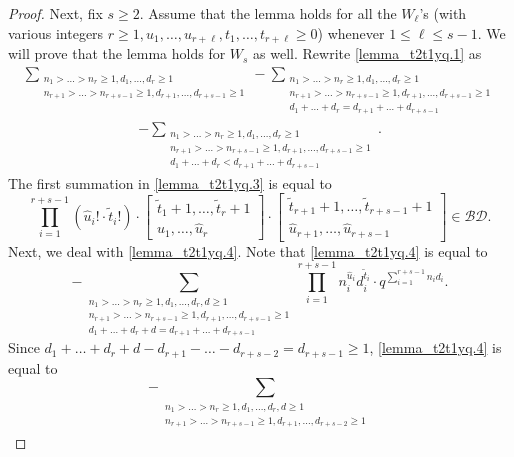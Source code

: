 \documentclass[12pt, reqno]{amsart}
\theoremstyle{definition}
\theoremstyle{remark}
\numberwithin{equation}{section}
\newcommand{\BD}{\mathcal {BD}}
\newcommand{\w}{\tilde}
\numberwithin{equation}{section}
\begin{document}
\begin{proof}
Next, fix $s \ge 2$. Assume that the lemma holds for all the $W_\ell$'s 
(with various integers $r \ge 1, u_1, \ldots, u_{r+\ell}, 
t_1, \ldots, t_{r+\ell} \ge 0$) whenever $1 \le \ell \le s-1$. 
We will prove that the lemma holds for $W_s$ as well.
Rewrite \eqref{lemma_t2t1yq.1} as
\begin{eqnarray}  \label{lemma_t2t1yq.3}
\sum_{\substack{n_1 > \ldots > n_r \ge 1, d_1, \ldots, d_r \ge 1\\
    n_{r+1} > \ldots > n_{r+s-1} \ge 1, d_{r+1}, \ldots, d_{r+s-1} \ge 1}}
- \sum_{\substack{n_1 > \ldots > n_r \ge 1, d_1, \ldots, d_r \ge 1\\
    n_{r+1} > \ldots > n_{r+s-1} \ge 1, d_{r+1}, \ldots, d_{r+s-1} \ge 1\\
    d_1+ \ldots + d_r = d_{r+1} + \ldots + d_{r+s-1}}}
\end{eqnarray}
\begin{eqnarray}  \label{lemma_t2t1yq.4}
- \sum_{\substack{n_1 > \ldots > n_r \ge 1, d_1, \ldots, d_r \ge 1\\
    n_{r+1} > \ldots > n_{r+s-1} \ge 1, d_{r+1}, \ldots, d_{r+s-1} \ge 1\\
    d_1+ \ldots + d_r < d_{r+1} + \ldots + d_{r+s-1}}}.
\end{eqnarray}
The first summation in \eqref{lemma_t2t1yq.3} is equal to
$$
\prod_{i=1}^{r+s-1} (\hat u_i! \cdot \w t_i!) \cdot 
   \begin{bmatrix} \w t_1 + 1, \ldots, \w t_r + 1\\
     \hat u_1, \ldots, \hat u_r 
   \end{bmatrix}
\cdot \begin{bmatrix} \w t_{r+1} + 1, \ldots, \w t_{r+s-1} + 1\\
     \hat u_{r+1}, \ldots, \hat u_{r+s-1}
   \end{bmatrix}
\in \BD.
$$
Next, we deal with \eqref{lemma_t2t1yq.4}. 
Note that \eqref{lemma_t2t1yq.4} is equal to
$$
- \sum_{\substack{n_1 > \ldots > n_r \ge 1, d_1, \ldots, d_r, d \ge 1\\
    n_{r+1} > \ldots > n_{r+s-1} \ge 1, d_{r+1}, \ldots, d_{r+s-1} \ge 1\\
    d_1+ \ldots + d_r + d = d_{r+1} + \ldots + d_{r+s-1}}}
    \prod_{i=1}^{r+s-1} n_i^{\hat u_i}d_i^{\w t_i}  
    \cdot q^{\sum_{i=1}^{r+s-1} n_i d_i}.
$$
Since $d_1+ \ldots + d_r + d - d_{r+1} - \ldots - d_{r+s-2} 
= d_{r+s-1} \ge 1$, \eqref{lemma_t2t1yq.4} is equal to
$$
- \sum_{\substack{n_1 > \ldots > n_r \ge 1, d_1, \ldots, d_r, d \ge 1\\
    n_{r+1} > \ldots > n_{r+s-1} \ge 1, d_{r+1}, \ldots, d_{r+s-2} \ge 1\\
}}$$
\end{proof}
\end{document}
